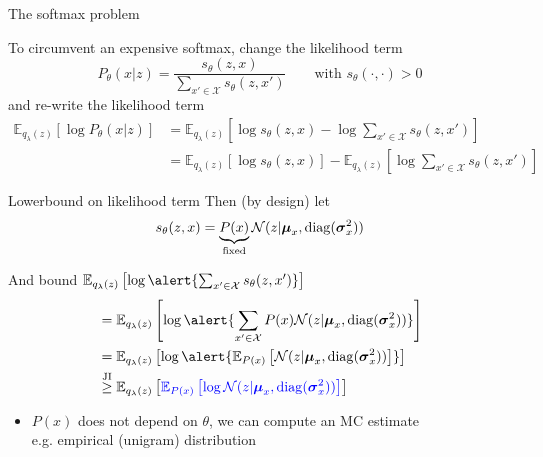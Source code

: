 \begin{frame}{The softmax problem}

To circumvent an expensive softmax, change the likelihood term
\begin{equation*}
P_\theta(x|z) = \frac{s_\theta(z, x)}{\sum_{x' \in \mathcal X} s_\theta(z, x')} \qquad \text{with } s_\theta(\cdot, \cdot) > 0
\end{equation*}
\pause
and re-write the likelihood term
\begin{equation*}
\begin{aligned}
\mathbb E_{q_\lambda(z)} \left[  \log P_\theta(x|z) \right] 
 &= \mathbb E_{q_\lambda(z)} \left[  \log s_\theta(z, x) - \log \sum_{x'\in \mathcal X}s_\theta(z, x')\right] \\
 &=\mathbb E_{q_\lambda(z)} \left[  \log s_\theta(z, x) \right] - \mathbb E_{q_\lambda(z)} \left[ \log \sum_{x'\in \mathcal X}s_\theta(z, x')\right]
\end{aligned}
\end{equation*}


\end{frame}

\begin{frame}[plain]{Lowerbound on likelihood term}
Then (by design) let
\begin{equation*}
s_\theta(z, x) = \underbrace{P(x)}_{\text{fixed}}\mathcal N(z|\boldsymbol \mu_x, \operatorname{diag}(\boldsymbol \sigma_x^2))
\end{equation*}
\pause

And bound $ \mathbb E_{q_\lambda(z)} \left[ \log \alert{\sum_{x'\in \mathcal X}s_\theta(z, x')}\right] $ 
\begin{equation*}
\begin{aligned} 
&=\mathbb E_{q_\lambda(z)} \left[ \log \alert{\sum_{x'\in \mathcal X} P(x)\mathcal N(z|\boldsymbol \mu_x, \diag(\boldsymbol \sigma_x^2))} \right] \\
&=\mathbb E_{q_\lambda(z)} \left[ \log \alert{\mathbb E_{P(x)}\left[ \mathcal N(z|\boldsymbol \mu_x, \diag(\boldsymbol \sigma_x^2)) \right]} \right] \\
&\overset{\text{JI}}{\ge} \mathbb E_{q_\lambda(z)} \left[ \textcolor{blue}{\mathbb E_{P(x)}\left[ \log \mathcal N(z|\boldsymbol \mu_x, \diag(\boldsymbol \sigma_x^2)) \right]} \right]
\end{aligned}
\end{equation*}

\begin{itemize}
	\item $P(x)$ does not depend on $\theta$, we can compute an MC estimate\\
	e.g. empirical (unigram) distribution
\end{itemize}

\end{frame}



